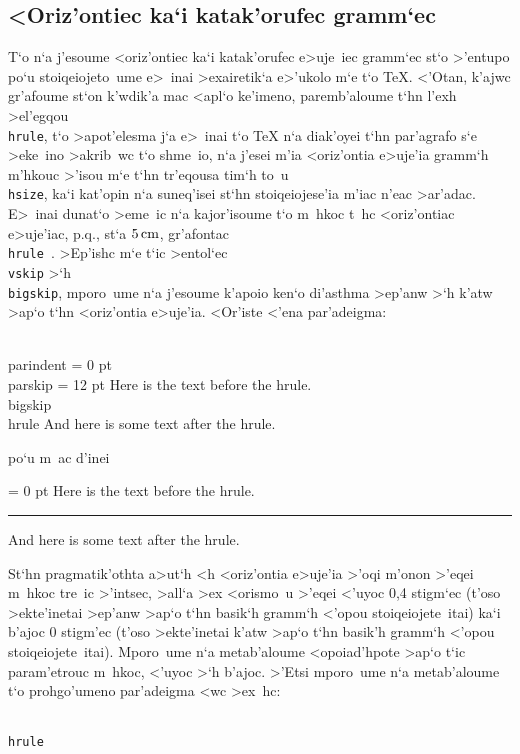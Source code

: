 \subsection{<Oriz'ontiec ka`i katak'orufec gramm`ec}

T`o n`a j'esoume <oriz'ontiec ka`i katak'orufec e>uje~iec gramm`ec st`o
>'entupo po`u stoiqeiojeto~ume e>~inai >exairetik`a e>'ukolo m`e t`o
{\rm \TeX\null}. <'Otan, k'ajwc gr'afoume st`on k'wdik'a mac <apl`o
ke'imeno, paremb'aloume t`hn l'exh >el'egqou {\tt \\hrule}, t`o
>apot'elesma j`a e>~inai t`o {\rm\TeX} n`a diak'oyei t`hn par'agrafo s`e
>eke~ino >akrib~wc t`o shme~io, n`a j'esei m'ia <oriz'ontia e>uje'ia
gramm`h m'hkouc >'isou m`e t`hn tr'eqousa tim`h to~u {\tt \\hsize}, ka`i
kat'opin n`a suneq'isei st`hn stoiqeiojese'ia m'iac n'eac >ar'adac. 
E>~inai dunat`o >eme~ic n`a kajor'isoume t`o m~hkoc t~hc <oriz'ontiac
e>uje'iac, p.q., st`a $5\,\rm cm$, gr'afontac {\tt \\hrule width 5 cm}.
>Ep'ishc m`e t`ic >entol`ec {\tt \\vskip} >`h {\tt \\bigskip}, mporo~ume
n`a j'esoume k'apoio ken`o di'asthma >ep'anw >`h k'atw >ap`o t`hn
<oriz'ontia e>uje'ia.  <Or'iste <'ena par'adeigma: 

\beginuser
\\parindent = 0 pt \\parskip = 12 pt
Here is the text before the hrule.
\\bigskip
\\hrule width 3 in
And here is some text after the hrule.
\enduser

\noindent po`u m~ac d'inei

{\rm
\parindent = 0 pt
Here is the text before the hrule.
\bigskip
\hrule width 3 in 
And here is some text after the hrule.
}

St`hn pragmatik'othta a>ut`h <h <oriz'ontia e>uje'ia >'oqi m'onon >'eqei
m~hkoc tre~ic >'intsec, >all`a >ex <orismo~u >'eqei <'uyoc 0,4
stigm`ec (t'oso >ekte'inetai >ep'anw >ap`o t`hn basik`h gramm`h <'opou
stoiqeiojete~itai) ka`i b'ajoc 0 stigm'ec (t'oso >ekte'inetai k'atw
>ap`o t`hn basik'h gramm`h <'opou stoiqeiojete~itai).  Mporo~ume n`a
metab'aloume <opoiad'hpote >ap`o t`ic param'etrouc m~hkoc, <'uyoc >`h
b'ajoc.  >'Etsi mporo~ume n`a metab'aloume t`o prohgo'umeno par'adeigma
<wc >ex~hc:

{\tt \\hrule width 3 in height 2 pt depth 3 pt }

